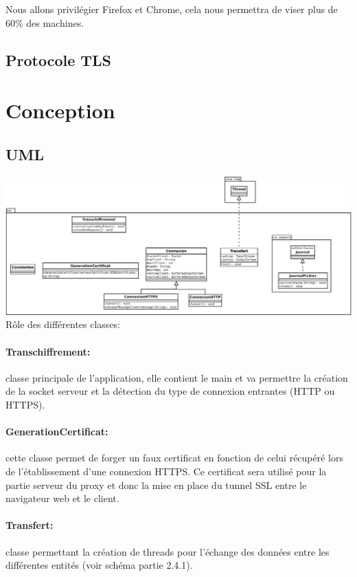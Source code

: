 \documentclass[a4paper,11pt,french]{report}
\begin{document}
Nous allons privilégier Firefox et Chrome, cela nous permettra de viser plus de 60\% des machines.

\subsection{Protocole TLS}




\section{Conception}

\subsection{UML}
\includegraphics[height=0.35\textheight, angle=90]{images/uml.pdf}
\newpage
Rôle des différentes classes:
	\paragraph{Transchiffrement:} classe principale de l'application, elle contient le main et
	va permettre la création de la socket serveur et la détection du type de connexion entrantes (HTTP ou HTTPS).
	\paragraph{GenerationCertificat:} cette classe permet de forger un faux certificat en fonction
	de celui récupéré lors de l'établissement d'une connexion HTTPS. Ce certificat 
	sera utilisé pour la partie serveur du proxy et donc la mise en place du tunnel 
	SSL entre le navigateur web et le client.
	\paragraph{Transfert:} classe permettant la création de threads pour l'échange
	des données entre les différentes entités (voir schéma partie 2.4.1).
\end{document}
